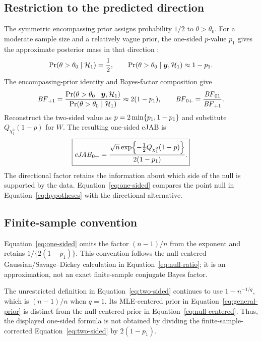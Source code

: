 \documentclass[11pt,letterpaper]{article}
\begin{document}
\subsection{Restriction to the predicted direction}
The symmetric encompassing prior assigns probability \(1/2\) to
\(\theta>\theta_0\). For a moderate sample size and a relatively vague
prior, the one-sided \(p\)-value \(p_1\) gives the approximate posterior
mass in that direction \citep{marsman2017three,wagenmakers2022approximate}:
\begin{equation}
 \Pr(\theta>\theta_0\mid\mathcal H_1)=\frac12,
 \qquad
 \Pr(\theta>\theta_0\mid\boldsymbol y,\mathcal H_1)\approx1-p_1.
 \label{eq:mass}
\end{equation}
The encompassing-prior identity and Bayes-factor composition give
\begin{equation}
 \mathit{BF}_{+1}
 =\frac{\Pr(\theta>\theta_0\mid\boldsymbol y,\mathcal H_1)}
        {\Pr(\theta>\theta_0\mid\mathcal H_1)}
 \approx2(1-p_1),
 \qquad
 \mathit{BF}_{0+}=\frac{\mathit{BF}_{01}}{\mathit{BF}_{+1}}.
 \label{eq:restriction}
\end{equation}
Reconstruct the two-sided value as \(p=2\min\{p_1,1-p_1\}\) and substitute
\(Q_{\chi_1^2}(1-p)\) for \(W\). The resulting one-sided eJAB is
\begin{equation}
 \boxed{\mathit{eJAB}_{0+}=\frac{\sqrt n\exp\!\left\{ -\frac12 Q_{\chi_1^2}(1-p)\right\}}{2(1-p_1)}.}
 \label{eq:one-sided}
\end{equation}
The directional factor retains the information about which side of the
null is supported by the data. Equation~\eqref{eq:one-sided} compares the
point null in Equation~\eqref{eq:hypotheses} with the directional
alternative.

\subsection{Finite-sample convention}
Equation~\eqref{eq:one-sided} omits the factor \((n-1)/n\) from the
exponent and retains \(1/\{2(1-p_1)\}\). This convention follows the
null-centered Gaussian/Savage--Dickey calculation in
Equation~\eqref{eq:null-ratio}; it is an approximation, not an exact
finite-sample conjugate Bayes factor.

The unrestricted definition in Equation~\eqref{eq:two-sided} continues
to use \(1-n^{-1/q}\), which is \((n-1)/n\) when \(q=1\).
Its MLE-centered prior in Equation~\eqref{eq:general-prior} is distinct
from the null-centered prior in Equation~\eqref{eq:null-centered}.
Thus, the displayed one-sided formula is not obtained by dividing the
finite-sample-corrected Equation~\eqref{eq:two-sided} by \(2(1-p_1)\).
\end{document}
